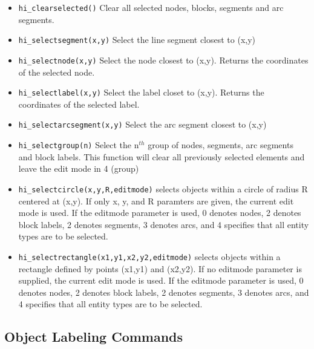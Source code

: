 \begin{itemize}
\item {\tt hi\_clearselected()} Clear all selected nodes, blocks, segments and arc
segments.

\item {\tt hi\_selectsegment(x,y)} Select the line segment closest to (x,y)

\item {\tt hi\_selectnode(x,y)} Select the node closest to (x,y).
Returns the coordinates of the selected node.

\item {\tt hi\_selectlabel(x,y)} Select the label closet to (x,y).
Returns the coordinates of the selected label.

\item {\tt hi\_selectarcsegment(x,y)} Select the arc segment closest to (x,y)

\item {\tt hi\_selectgroup(n)} Select the n$^{th}$ group of nodes, segments, arc
segments and block labels. This function will clear all previously selected
elements and leave the edit mode in 4 (group)

\item{\tt hi\_selectcircle(x,y,R,editmode)} selects objects within a circle of radius
R centered at (x,y).  If only x, y, and R paramters are given, the current
edit mode is used.  If the editmode parameter is used, 0 denotes nodes, 2
denotes block labels, 2 denotes segments, 3 denotes arcs, and 4 specifies
that all entity types are to be selected.

\item{\tt hi\_selectrectangle(x1,y1,x2,y2,editmode)} selects objects within a rectangle
defined by points (x1,y1) and (x2,y2). If no editmode parameter is supplied,
the current edit mode is used.  If the editmode parameter is used, 0 denotes
nodes, 2 denotes block labels, 2 denotes segments, 3 denotes arcs, and 4
specifies that all entity types are to be selected.
\end{itemize}


\subsection{Object Labeling Commands}

